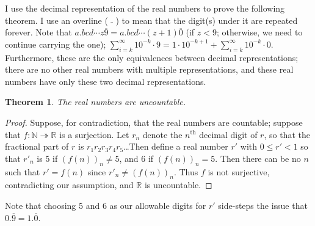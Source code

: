 \documentclass[letterpaper,11pt,showproblems]{pset}
\newtheorem*{thm*}{Theorem}
\theoremstyle{definition} \newtheorem{defn}{Definition}[section]
\theoremstyle{definition} \newtheorem*{defn*}{Definition}
\begin{document}
  I use the decimal representation of the real numbers to prove the following theorem.  I use an overline ( $\bar{}$ ) to mean that the digit(s) under it are repeated forever.  Note that $a.bcd\cdots z\overline{9} = a.bcd\cdots (z+1)\overline{0}$ (if $z < 9$; otherwise, we need to continue carrying the one); $\sum_{i=k}^\infty 10^{-k} \cdot 9 = 1 \cdot 10^{-k + 1} + \sum_{i=k}^\infty 10^{-k} \cdot 0$.  Furthermore, these are the only equivalences between decimal representations; there are no other real numbers with multiple representations, and these real numbers have only these two decimal representations.
  \begin{thm*}
    The real numbers are uncountable.
  \end{thm*}
  \begin{proof}
    Suppose, for contradiction, that the real numbers are countable; suppose that $f: \mathbb N \twoheadrightarrow \mathbb R$ is a surjection.  Let $r_n$ denote the $n^\text{th}$ decimal digit of $r$, so that the fractional part of $r$ is $r_1r_2r_3r_4r_5$\ldots  Then define a real number $r'$ with $0 \le r' < 1$ so that $r'_n$ is 5 if $(f(n))_n \ne 5$, and 6 if $(f(n))_n = 5$.  Then there can be no $n$ such that $r' = f(n)$ since $r'_n \ne (f(n))_n$.  Thus $f$ is not surjective, contradicting our assumption, and $\mathbb R$ is uncountable.
  \end{proof}
  Note that choosing 5 and 6 as our allowable digits for $r'$ side-steps the issue that $0.\overline{9} = 1.\overline{0}$.  
\end{document}
